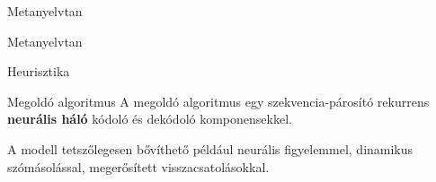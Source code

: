 \documentclass[10pt]{beamer}
\begin{document}
\begin{frame}{Metanyelvtan}
  \begin{center}
  \end{center}
\end{frame}

\begin{frame}{Metanyelvtan}
  \begin{center}
  \end{center}
\end{frame}

\begin{frame}{Heurisztika}
  \begin{block}{Megoldó algoritmus}
    A megoldó algoritmus egy szekvencia-párosító rekurrens \\ \textbf{neurális háló} kódoló és dekódoló komponensekkel.
  \end{block}
  A modell tetszőlegesen bővíthető például neurális figyelemmel, dinamikus szómásolással, megerősített visszacsatolásokkal.
\end{frame}
\end{document}
